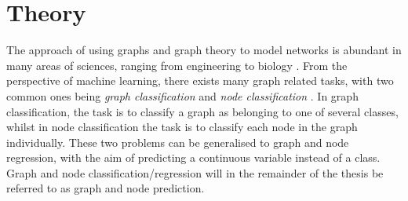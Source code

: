\chapter{Theory}
\label{chap:theory}

The approach of using graphs and graph theory to model networks is abundant in many areas of sciences, ranging from engineering to biology \cite{network_science_chap1}. From the perspective of machine learning, there exists many graph related tasks, with two common ones being \textit{graph classification} and \textit{node classification} \cite{quadratic_graph_classification, active_learning_node_classification}. In graph classification, the task is to classify a graph as belonging to one of several classes, whilst in node classification the task is to classify each node in the graph individually. These two problems can be generalised to graph and node regression, with the aim of predicting a continuous variable instead of a class. Graph and node classification/regression will in the remainder of the thesis be referred to as graph and node prediction. 
%         

